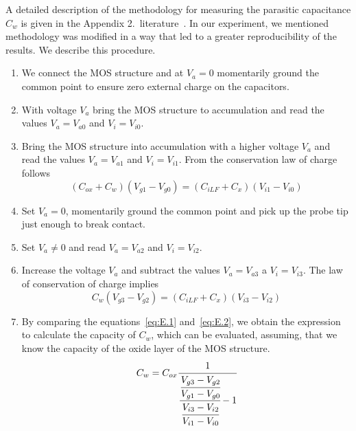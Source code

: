 A detailed description of the methodology for measuring the parasitic
capacitance $C_w$ is given in the Appendix
2.\ literature~\cite{App.2}. In our experiment, we mentioned
methodology was modified in a way that led to a greater
reproducibility of the results. We describe this procedure.

\begin{enumerate}

\item We connect the MOS structure and at $V_a = 0$ momentarily ground
  the common point to ensure zero external charge on the capacitors.

\item With voltage $V_a$ bring the MOS structure to accumulation and
  read the values $V_a = V_{a0}$ and $V_i = V_{i0}$.

\item Bring the MOS structure into accumulation with a higher voltage
  $V_a$ and read the values $V_a = V_{a1}$ and $V_i = V_{i1}$. From the
  conservation law of charge follows
  \begin{equation}\label{eq:E.1}
  (C_{ox} + C_w)(V_{g1} - V_{g0}) = (C_{iLF} + C_x)(V_{i1} - V_{i0})
  \end{equation}

\item Set $V_a=0$, momentarily ground the common point and pick up the
  probe tip just enough to break contact.

\item Set $V_a \neq 0$ and read $V_a = V_{a2}$ and  $V_i = V_{i2}$.

\item Increase the voltage $V_a$ and subtract the values $V_a =
  V_{a3}$ a $V_i = V_{i3}$. The law of conservation of charge implies
  \begin{equation}\label{eq:E.2}
    C_w(V_{g3} - V_{g2}) = (C_{iLF} + C_x)(V_{i3} - V_{i2})
  \end{equation}

\item By comparing the equations~\ref{eq:E.1} and~\ref{eq:E.2}, we
  obtain the expression to calculate the capacity of $C_w$, which can
  be evaluated, assuming, that we know the capacity of the oxide layer
  of the MOS structure.
  \begin{equation}\label{eq:E.3}
    C_w = C_{ox} \cfrac{1} {\cfrac{\cfrac{V_{g3}-V_{g2}}{V_{g1}-V_{g0}}} {\cfrac{V_{i3}-V_{i2}}{V_{i1}-V_{i0}}} -1}
  \end{equation}

\end{enumerate}

